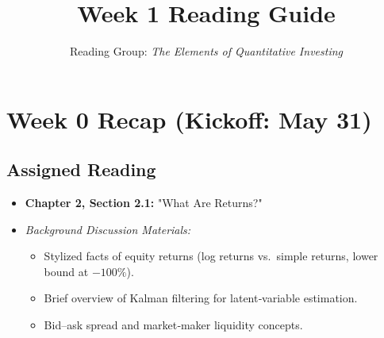 \documentclass[11pt]{amsart}
\title{Week 1 Reading Guide}
\author{Reading Group: \emph{The Elements of Quantitative Investing}}
\begin{document}
\newtheorem{proposition}{Proposition}

\maketitle

\section{Week 0 Recap (Kickoff: May 31)}
\subsection*{Assigned Reading}
\begin{itemize}[noitemsep,left=0pt]
	\item \textbf{Chapter 2, Section 2.1:} "What Are Returns?"
	\item \emph{Background Discussion Materials:}
	      \begin{itemize}[noitemsep,left=2em]
		      \item Stylized facts of equity returns (log returns vs.\ simple returns, lower bound at $-100\%$).
		      \item Brief overview of Kalman filtering for latent‐variable estimation.
		      \item Bid–ask spread and market‐maker liquidity concepts.
	      \end{itemize}
\end{itemize}
\end{document}
